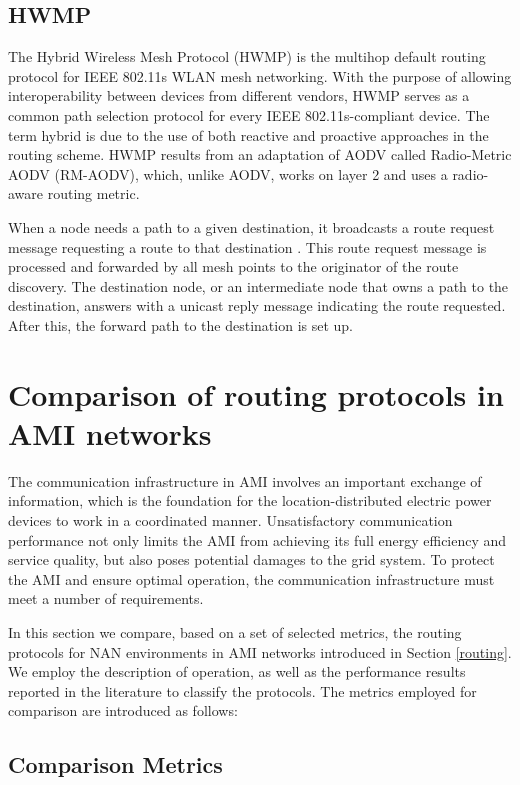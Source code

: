 \documentclass[11pt,draftclsnofoot,onecolumn]{IEEEtran}
\begin{document}
\subsection{HWMP}\label{hwmp}

The Hybrid Wireless Mesh Protocol (HWMP) is the multihop default routing protocol for IEEE 802.11s WLAN mesh networking. With the purpose of allowing interoperability between devices from different vendors, HWMP serves as a common path selection protocol for every IEEE 802.11s-compliant device. The term hybrid is due to the use of both reactive and proactive approaches in the routing scheme. HWMP results from an adaptation of AODV called Radio-Metric AODV (RM-AODV), which, unlike AODV, works on layer 2 and uses a radio-aware routing metric. 

When a node needs a path to a given destination, it broadcasts a route request message requesting a route to that destination \cite{Bahr2006}. This route request message is processed and forwarded by all mesh points to the originator of the route discovery. The destination node, or an intermediate node that owns a path to the destination, answers with a unicast reply message indicating the route requested. After this, the forward path to the destination is set up. 


\section{Comparison of routing protocols in AMI networks}\label{metrics}

The communication infrastructure in AMI involves an important exchange of information, which is the foundation for the location-distributed electric power devices to work in a coordinated manner. Unsatisfactory communication performance not only limits the AMI from achieving its full energy efficiency and service quality, but also poses potential damages to the grid system. To protect the AMI and ensure optimal operation, the communication infrastructure must meet a number of requirements.

In this section we compare, based on a set of selected metrics, the routing protocols for NAN environments in AMI networks introduced in Section \ref{routing}. We employ the description of operation, as well as the performance results reported in the literature to classify the protocols. The metrics employed for comparison are introduced as follows:

\subsection{Comparison Metrics}
\end{document}

